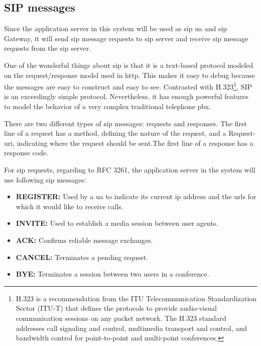 \subsection{SIP messages}
\noindent Since the application server in this system will be used as \gls{sip} \gls{ua} and \gls{sip} Gateway, it will send \gls{sip} message requests to \gls{sip} server and receive \gls{sip} message requests from the \gls{sip} server.

\par One of the wonderful things about \gls{sip} is that it is a text-based protocol modeled on the request/response model used in \gls{http}. This makes it easy to debug because the messages are easy to construct and easy to see.  Contrasted with H.323\footnote{H.323 is a recommendation from the ITU Telecommunication Standardization Sector (ITU-T) that defines the protocols to provide audio-visual communication sessions on any packet network. The H.323 standard addresses call signaling and control, multimedia transport and control, and bandwidth control for point-to-point and multi-point conferences.\cite{wiki:h323}}, SIP is an exceedingly simple protocol.  Nevertheless, it has enough powerful features to model the behavior of a very complex traditional telephone \gls{pbx}.\cite{networkworld:sip}

\par There are two different types of \gls{sip} messages: requests and responses. The first line of a request has a method, defining the nature of the request, and a Request-\gls{uri}, indicating where the request should be sent.The first line of a response has a response code.

\noindent For sip requests, regarding to RFC 3261\cite{rfc:3261}, the application server in the system will use following \gls{sip} messages:

\begin{itemize}[topsep=-1em,parsep=0em,itemsep=0em]
 \item \textbf{REGISTER:} Used by a \gls{ua} to indicate its current \gls{ip} address and the \gls{url}s for which it would like to receive calls.
 \item \textbf{INVITE:} Used to establish a media session between user agents.
 \item \textbf{ACK:} Confirms reliable message exchanges.
 \item \textbf{CANCEL:} Terminates a pending request.
 \item \textbf{BYE:} Terminates a session between two users in a conference.
\end{itemize}

